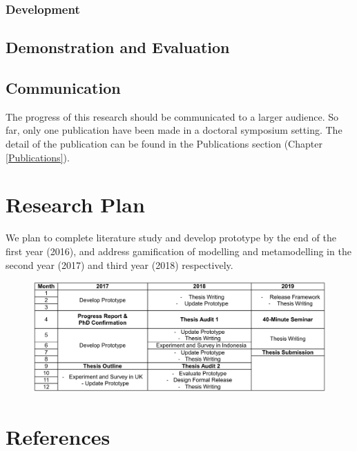 \documentclass[12pt, a4paper]{report} \usepackage[titletoc]{appendix}
\begin{document}
\subsection{Development}

\section{Demonstration and Evaluation}

\section{Communication}
The progress of this research should be communicated to a larger audience. So far, only one publication have been made in a doctoral symposium setting. The detail of the publication can be found in the Publications section (Chapter \ref{Publications}).

\chapter{Research Plan}
\label{Research Plan}
We plan to complete literature study and develop prototype by the end of the first year (2016), and address gamification of modelling and metamodelling in the second year (2017) and third year (2018) respectively. 

\begin {table}[ht]
\caption {Research Timetable} 
\end{table}
\begin{figure}[ht]
\centering
\includegraphics[width=\textwidth]{timetable}
\end{figure}

\chapter{References}
\label{References}

\begingroup

\renewcommand{\chapter}[2]{}%

\endgroup
\end{document}
